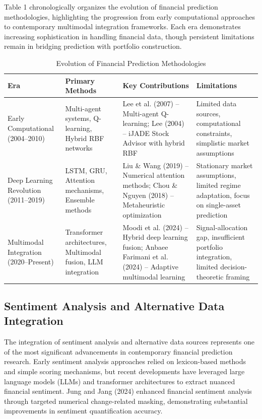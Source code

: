 \documentclass{singlecol-new}
\theoremstyle{TH}{
\newtheorem{lemma}{Lemma}
\newtheorem{theorem}[lemma]{Theorem}
\newtheorem{corrolary}[lemma]{Corrolary}
\newtheorem{conjecture}[lemma]{Conjecture}
\newtheorem{proposition}[lemma]{Proposition}
\newtheorem{claim}[lemma]{Claim}
\newtheorem{stheorem}[lemma]{Wrong Theorem}
\newtheorem{algorithm}{Algorithm}
}
\theoremstyle{THrm}{
\newtheorem{definition}{Definition}[section]
\newtheorem{question}{Question}[section]
\newtheorem{remark}{Remark}
\newtheorem{scheme}{Scheme}
}
\theoremstyle{THhit}{
\newtheorem{case}{Case}[section]
}
\begin{document}
Table 1 chronologically organizes the evolution of financial prediction methodologies, highlighting the progression from early computational approaches to contemporary multimodal integration frameworks. Each era demonstrates increasing sophistication in handling financial data, though persistent limitations remain in bridging prediction with portfolio construction.

\begin{table}[!ht]
\centering
\caption{Evolution of Financial Prediction Methodologies}
\label{tab:methodology_evolution}
\small
\begin{tabular}{p{2.5cm}p{2.5cm}p{2.5cm}p{2.5cm}}
\hline
\textbf{Era} & \textbf{Primary Methods} & \textbf{Key Contributions} & \textbf{Limitations} \\
\hline
Early Computational (2004--2010) & Multi-agent systems, Q-learning, Hybrid RBF networks & Lee et al. (2007) -- Multi-agent Q-learning; Lee (2004) -- iJADE Stock Advisor with hybrid RBF & Limited data sources, computational constraints, simplistic market assumptions \\
\hline
Deep Learning Revolution (2011--2019) & LSTM, GRU, Attention mechanisms, Ensemble methods & Liu \& Wang (2019) -- Numerical attention methods; Chou \& Nguyen (2018) -- Metaheuristic optimization & Stationary market assumptions, limited regime adaptation, focus on single-asset prediction \\
\hline
Multimodal Integration (2020--Present) & Transformer architectures, Multimodal fusion, LLM integration & Moodi et al. (2024) -- Hybrid deep learning fusion; Anbaee Farimani et al. (2024) -- Adaptive multimodal learning & Signal-allocation gap, insufficient portfolio integration, limited decision-theoretic framing \\
\hline
\end{tabular}
\end{table}



\subsection{Sentiment Analysis and Alternative Data Integration}
The integration of sentiment analysis and alternative data sources represents one of the most significant advancements in contemporary financial prediction research. Early sentiment analysis approaches relied on lexicon-based methods and simple scoring mechanisms, but recent developments have leveraged large language models (LLMs) and transformer architectures to extract nuanced financial sentiment. Jung and Jang (2024) enhanced financial sentiment analysis through targeted numerical change-related masking, demonstrating substantial improvements in sentiment quantification accuracy.
\end{document}
